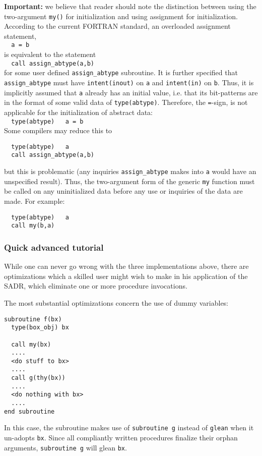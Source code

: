 {\bf Important:} we believe that reader should note the distinction
between using the two-argument \verb+my()+ for initialization and
using assignment for initialization.  According to the current FORTRAN
standard, an overloaded assignment statement,\\
\verb+  a = b+\\
is equivalent to the statement\\
\verb+  call assign_abtype(a,b)+\\
for some user defined \verb+assign_abtype+ subroutine.  It is
further specified that \verb+assign_abtype+ must have 
\verb+intent(inout)+ on \verb+a+ and \verb+intent(in)+ on \verb+b+.
Thus, it is implicitly assumed that \verb+a+ already has
an initial value, i.e. that its bit-patterns are in the format
of some valid data of \verb+type(abtype)+.  Therefore, the \verb+=+-sign,
is not applicable for the initialization of abstract data:\\
\verb+  type(abtype)   a = b+\\
Some compilers may reduce this to
\begin{verbatim}
  type(abtype)   a
  call assign_abtype(a,b)
\end{verbatim}
but this is problematic (any inquiries \verb+assign_abtype+ makes
into \verb+a+ would have an unspecified result).  Thus, the two-argument
form of the generic \verb+my+ function must be called on any uninitialized
data before any use or inquiries of the data are made.  For example:
\begin{verbatim}
  type(abtype)   a
  call my(b,a)
\end{verbatim}

\subsubsection{Quick advanced tutorial}

While one can never go wrong with the three implementations
above, there are optimizations which a skilled user might
wish to make in his application of the SADR, which eliminate
one or more procedure invocations.

The most substantial optimizations concern the use of dummy variables:
\begin{verbatim}
subroutine f(bx)
  type(box_obj) bx

  call my(bx)
  ....
  <do stuff to bx>
  ....
  call g(thy(bx))
  ....
  <do nothing with bx>
  ....
end subroutine
\end{verbatim}
In this case, the subroutine makes use of \verb+subroutine g+
instead of \verb+glean+ when it un-adopts \verb+bx+.
Since all compliantly written procedures finalize their orphan
arguments, \verb+subroutine g+ will glean \verb+bx+.

